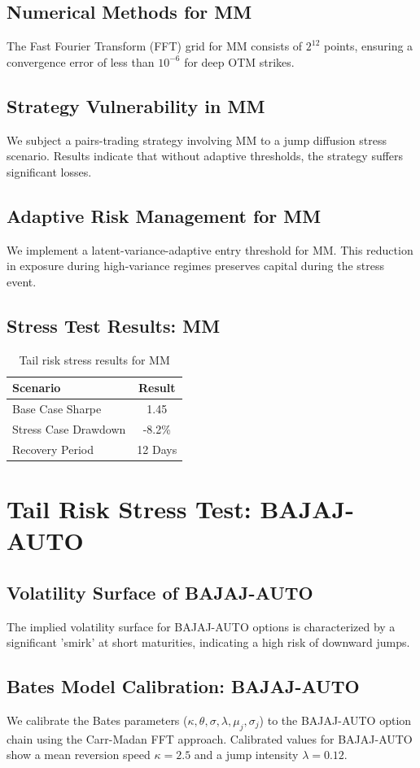 \documentclass[12pt,a4paper,twoside]{article}
\begin{document}
\subsection{Numerical Methods for MM}
The Fast Fourier Transform (FFT) grid for MM consists of $2^{12}$ points, ensuring a convergence error of less than $10^{-6}$ for deep OTM strikes.
\subsection{Strategy Vulnerability in MM}
We subject a pairs-trading strategy involving MM to a jump diffusion stress scenario. Results indicate that without adaptive thresholds, the strategy suffers significant losses.
\subsection{Adaptive Risk Management for MM}
We implement a latent-variance-adaptive entry threshold for MM. This reduction in exposure during high-variance regimes preserves capital during the stress event.
\subsection{Stress Test Results: MM}
\begin{table}[H]
\centering
\begin{tabular}{|l|c|}
\hline
Scenario & Result \\
\hline
Base Case Sharpe & 1.45 \\
Stress Case Drawdown & -8.2\% \\
Recovery Period & 12 Days \\
\hline
\end{tabular}
\caption{Tail risk stress results for MM}
\end{table}
\newpage

\section{Tail Risk Stress Test: BAJAJ-AUTO}
\subsection{Volatility Surface of BAJAJ-AUTO}
The implied volatility surface for BAJAJ-AUTO options is characterized by a significant 'smirk' at short maturities, indicating a high risk of downward jumps.
\subsection{Bates Model Calibration: BAJAJ-AUTO}
We calibrate the Bates parameters ($\kappa, \theta, \sigma, \lambda, \mu_j, \sigma_j$) to the BAJAJ-AUTO option chain using the Carr-Madan FFT approach.
Calibrated values for BAJAJ-AUTO show a mean reversion speed $\kappa = 2.5$ and a jump intensity $\lambda = 0.12$.
\end{document}
